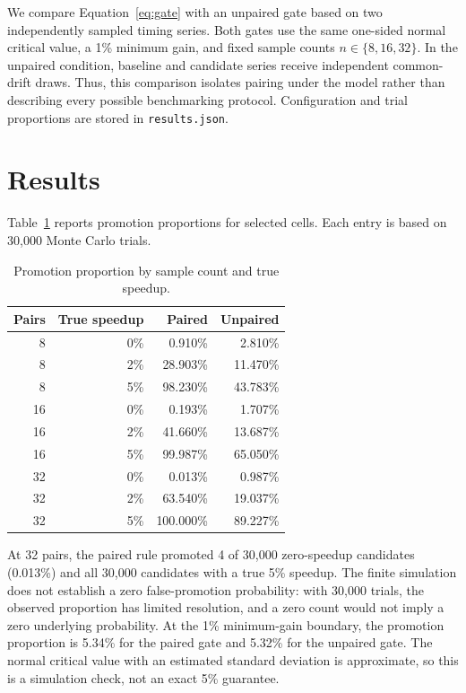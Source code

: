 \documentclass[11pt]{article}
\begin{document}
We compare Equation~\ref{eq:gate} with an unpaired gate based on two independently sampled timing series. Both gates use the same one-sided normal critical value, a 1\% minimum gain, and fixed sample counts $n\in\{8,16,32\}$. In the unpaired condition, baseline and candidate series receive independent common-drift draws. Thus, this comparison isolates pairing under the model rather than describing every possible benchmarking protocol. Configuration and trial proportions are stored in \texttt{results.json}.

\section{Results}
Table~\ref{tab:results} reports promotion proportions for selected cells. Each entry is based on 30,000 Monte Carlo trials.
\begin{table}[t]
\centering
\small
\caption{Promotion proportion by sample count and true speedup.}
\label{tab:results}
\begin{tabular}{rrrr}
\toprule
Pairs & True speedup & Paired & Unpaired\\
\midrule
8  & 0\% & 0.910\% & 2.810\%\\
8  & 2\% & 28.903\% & 11.470\%\\
8  & 5\% & 98.230\% & 43.783\%\\
16 & 0\% & 0.193\% & 1.707\%\\
16 & 2\% & 41.660\% & 13.687\%\\
16 & 5\% & 99.987\% & 65.050\%\\
32 & 0\% & 0.013\% & 0.987\%\\
32 & 2\% & 63.540\% & 19.037\%\\
32 & 5\% & 100.000\% & 89.227\%\\
\bottomrule
\end{tabular}
\end{table}

At 32 pairs, the paired rule promoted 4 of 30,000 zero-speedup candidates (0.013\%) and all 30,000 candidates with a true 5\% speedup. The finite simulation does not establish a zero false-promotion probability: with 30,000 trials, the observed proportion has limited resolution, and a zero count would not imply a zero underlying probability. At the 1\% minimum-gain boundary, the promotion proportion is 5.34\% for the paired gate and 5.32\% for the unpaired gate. The normal critical value with an estimated standard deviation is approximate, so this is a simulation check, not an exact 5\% guarantee.
\end{document}
